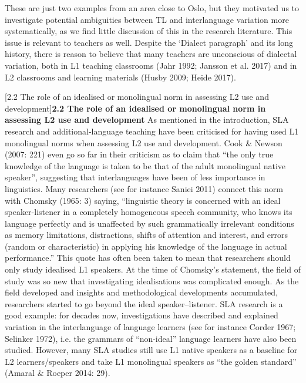 \documentclass[12pt]{article}
\makeatletter
\renewcommand\section{\@startsection{section}{1}{0.0cm}{0in}{0.1mm}{\normalfont\normalsize\fontsize{12pt}{14.4pt}\selectfont\raggedright}}
\newenvironment{styleStandard}{\renewcommand\baselinestretch{1.0}\setlength\leftskip{0cm}\setlength\rightskip{0cm plus 1fil}\setlength\parindent{0cm}\setlength\parfillskip{0pt plus 1fil}\setlength\parskip{0in plus 1pt}\writerlistparindent\writerlistleftskip\leavevmode\normalfont\normalsize\writerlistlabel\ignorespaces}{\unskip\vspace{0in plus 1pt}\par}
\newcommand\writerlistleftskip{}
\newcommand\writerlistparindent{}
\newcommand\writerlistlabel{}
\makeatother
\begin{document}
\begin{styleStandard}
These are just two examples from an area close to Oslo, but they motivated us to investigate potential ambiguities between TL and interlanguage variation more systematically, as we find little discussion of this in the research literature. This issue is relevant to teachers as well. Despite the ‘Dialect paragraph’ and its long history, there is reason to believe that many teachers are unconscious of dialectal variation, \- both in L1 teaching classrooms (Jahr 1992; Jansson et al. 2017) and in L2 classrooms and learning materials (Husby 2009; Heide 2017). 
\end{styleStandard}

\section[2.2 The role of an idealised or monolingual norm in assessing L2 use and development]{\textbf{2.2 The role of an idealised or monolingual norm in assessing L2 use and development}}
\begin{styleStandard}
As mentioned in the introduction, SLA research and additional-language teaching have been criticised for having used L1 monolingual norms when assessing L2 use and development. Cook \& Newson (2007: 221) even go so far in their criticism as to claim that “the only true knowledge of the language is taken to be that of the adult monolingual native speaker”, suggesting that interlanguages have been of less importance in linguistics. Many researchers (see for instance Saniei 2011) connect this norm with Chomsky (1965: 3) saying, “linguistic theory is concerned with an ideal speaker-listener in a completely homogeneous speech community, who knows its language perfectly and is unaffected by such grammatically irrelevant conditions as memory limitations, distractions, shifts of attention and interest, and errors (random or characteristic) in applying his knowledge of the language in actual performance.” This quote has often been taken to mean that researchers should only study idealised L1 speakers. At the time of Chomsky’s statement, the field of study was so new that investigating idealisations was complicated enough. As the field developed and insights and methodological developments accumulated, researchers started to go beyond the ideal speaker–listener. SLA research is a good example: for decades now, investigations have described and explained variation in the interlanguage of language learners (see for instance Corder 1967; Selinker 1972), i.e. the grammars of “non-ideal” language learners have also been studied. However, many SLA studies still use L1 native speakers as a baseline for L2 learners/speakers and take L1 monolingual speakers as “the golden standard” (Amaral \& Roeper 2014: 29). 
\end{styleStandard}
\end{document}
